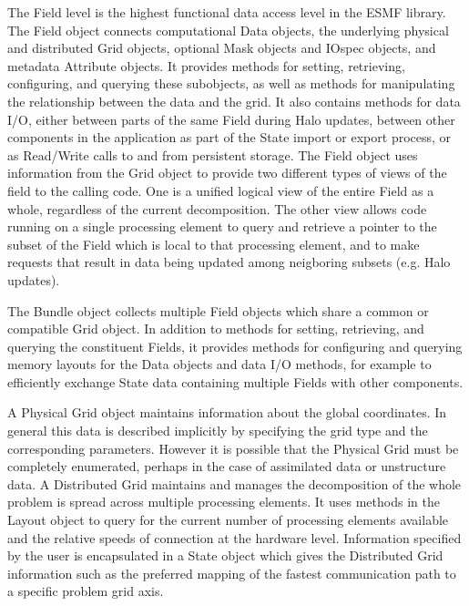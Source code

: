 The Field level is the highest functional data access level in the ESMF library.
The Field object connects computational Data objects, the underlying
physical and distributed Grid objects, optional Mask objects and IOspec
objects, and metadata Attribute objects.  
It provides methods
for setting, retrieving, configuring, and querying these subobjects,
as well as methods for manipulating the relationship between the
data and the grid.  It also contains methods for data I/O, either
between parts of the same Field during Halo updates, between
other components in the application as part of the State import or
export process, or as Read/Write calls to and from persistent storage.
The Field object uses information from the Grid object to provide
two different types of views of the field to the calling code.
One is a unified logical view of the entire Field as a whole,
regardless of the current decomposition.  The other view allows code
running on a single processing element to query and retrieve a pointer 
to the subset of the Field which is local to that processing element,
and to make requests that result in data being updated among neigboring
subsets (e.g. Halo updates).

The Bundle object collects multiple Field objects which share a
common or compatible Grid object.  In addition to methods for
setting, retrieving, and querying the constituent Fields, it provides
methods for configuring and querying memory layouts for the Data objects
and data I/O methods, for example to efficiently exchange State data
containing multiple Fields with other components.

A Physical Grid object maintains
information about the global coordinates.  In general this data
is described implicitly by specifying the grid type and the
corresponding parameters.  However it is possible that the
Physical Grid must be completely enumerated, perhaps in the
case of assimilated data or unstructure data.
A Distributed Grid maintains and manages
the decomposition of the whole problem is spread across multiple
processing elements.  It uses methods in the Layout object to
query for the current number of processing elements available
and the relative speeds of connection at the hardware level.  
Information specified by
the user is encapsulated in a State object which gives the
Distributed Grid information such as the preferred mapping of
the fastest communication path to a specific problem grid axis.

